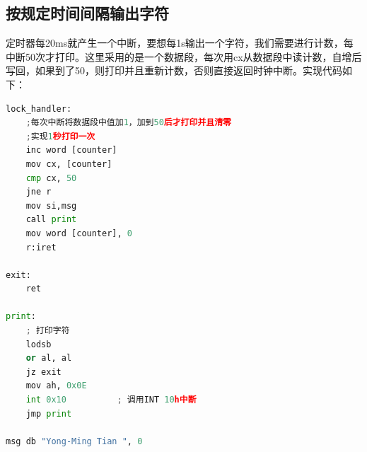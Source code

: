 \documentclass{LabReport}
\begin{document}
\subsection{按规定时间间隔输出字符}
定时器每20ms就产生一个中断，要想每1s输出一个字符，我们需要进行计数，每中断50次才打印。这里采用的是一个数据段，每次用cx从数据段中读计数，自增后写回，如果到了50，则打印并且重新计数，否则直接返回时钟中断。实现代码如下：
\begin{lstlisting}[language=python,frame=shadowbox]
lock_handler:
	;每次中断将数据段中值加1，加到50后才打印并且清零
	;实现1秒打印一次
	inc word [counter]
	mov cx, [counter]
	cmp cx, 50
	jne r
	mov si,msg
	call print
	mov word [counter], 0
	r:iret
	
exit:
	ret
	
print:
	; 打印字符
	lodsb
	or al, al
	jz exit
	mov ah, 0x0E
	int 0x10          ; 调用INT 10h中断
	jmp print
	
msg db "Yong-Ming Tian ", 0
\end{lstlisting}
	
	
\end{document}
